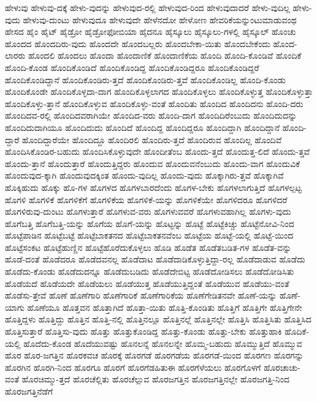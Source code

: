 {ಹೇಳುವು
ಹೇಳುವು-ದಕ್ಕೆ
ಹೇಳು-ವುದನ್ನು
ಹೇಳುವುದ-ರಲ್ಲಿ
ಹೇಳುವುದ-ರಿಂದ
ಹೇಳುವುದಾದರೆ
ಹೇಳು-ವುದಿಲ್ಲ
ಹೇಳು-ವುದು
ಹೇಳುವು-ದುಂಟು
ಹೇಳುವುದೂ
ಹೇಳುವುದೇ
ಹೇಳೆನದೋ
ಹೇಳೋಣ
ಹೇವರಿಕೆಯನ್ನುಂಟುಮಾಡುವಂಥ
ಹೇಸದ
ಹೈಂ
ಹೈಟ್
ಹೈಡ್ರೋ
ಹೈಡ್ರೋಫೋಬಿಯಾ
ಹೈದನೂ
ಹೈಸ್ಕೂಲು
ಹೈಸ್ಕೂಲು-ಗಳಲ್ಲಿ
ಹೈಸ್ಕೂಲ್
ಹೊಂಚು
ಹೊಂದದ
ಹೊಂದದಿರು-ವುದು
ಹೊಂದದೇ
ಹೊಂದಬಲ್ಲರು
ಹೊಂದಬೇಕಾ-ಯಿತು
ಹೊಂದಬೇಕೆಂದು
ಹೊಂದ-ಲಾರರು
ಹೊಂದಲಿ
ಹೊಂದಲು
ಹೊಂದಾ
ಹೊಂದಾಣಿಕೆ
ಹೊಂದಾಣಿಕೆಯ
ಹೊಂದಿ
ಹೊಂದಿ-ಕೊಂಡಿವೆ
ಹೊಂದಿಕೆ
ಹೊಂದಿ-ಕೊಂಡ
ಹೊಂದಿಕೊಂಡಿದೆ
ಹೊಂದಿಕೊಂಡಿದ್ದ
ಹೊಂದಿಕೊಂಡಿದ್ದರೂ
ಹೊಂದಿಕೊಂಡಿದ್ದರೆ
ಹೊಂದಿಕೊಂಡಿದ್ದಾನೆ
ಹೊಂದಿಕೊಂಡಿರು-ತ್ತದೆ
ಹೊಂದಿಕೊಂಡಿರು-ತ್ತವೆ
ಹೊಂದಿಕೊಂಡಿಲ್ಲ
ಹೊಂದಿ-ಕೊಂಡು
ಹೊಂದಿಕೊಂಡೇ
ಹೊಂದಿಕೊಳ್ಳದಾ-ದಾಗ
ಹೊಂದಿಕೊಳ್ಳಲಾಗದ
ಹೊಂದಿಕೊಳ್ಳಲು
ಹೊಂದಿಕೊಳ್ಳುತ್ತ
ಹೊಂದಿಕೊಳ್ಳುತ್ತಾ
ಹೊಂದಿಕೊಳ್ಳು-ತ್ತಾನೆ
ಹೊಂದಿಕೊಳ್ಳುವ
ಹೊಂದಿಕೊಳ್ಳು-ವಂತೆ
ಹೊಂದಿತು
ಹೊಂದಿದ
ಹೊಂದಿದನು
ಹೊಂದಿ-ದರು
ಹೊಂದಿದವ-ರಲ್ಲಿ
ಹೊಂದಿದವರಾಗಿಯೇ
ಹೊಂದಿದ-ವರು
ಹೊಂದಿ-ದಾಗ
ಹೊಂದಿದಿರೆಂಬುದು
ಹೊಂದಿದುದನ್ನು
ಹೊಂದಿದುದಾಗಿಯೂ
ಹೊಂದಿದುದು
ಹೊಂದಿದೆ
ಹೊಂದಿದ್ದ
ಹೊಂದಿದ್ದರೂ
ಹೊಂದಿದ್ದಾಗಿ
ಹೊಂದಿದ್ದಾನೆ
ಹೊಂದಿ-ದ್ದಾರೆ
ಹೊಂದಿದ್ದಾರೆಯೇ
ಹೊಂದಿದ್ದೂ
ಹೊಂದಿರಲಿ
ಹೊಂದಿರು-ತ್ತದೆ
ಹೊಂದಿರುವ
ಹೊಂದಿಲ್ಲ
ಹೊಂದಿವೆ
ಹೊಂದಿಸಿಕೊಂಡಿರ-ಬಹುದು
ಹೊಂದಿಸಿಕೊಳ್ಳುವುದೇ
ಹೊಂದೀತೆಂಬ
ಹೊಂದು-ತ್ತದೆ
ಹೊಂದುತ್ತ-ಲಿದೆ
ಹೊಂದು-ತ್ತವೆ
ಹೊಂದು-ತ್ತಾನೆ
ಹೊಂದುತ್ತಾರೆ
ಹೊಂದುತ್ತಿದ್ದರು
ಹೊಂದುವ
ಹೊಂದುವನೆಂಬುದು
ಹೊಂದು-ವಾಗ
ಹೊಂದುವಿಕೆ
ಹೊಂದುವುದ-ಕ್ಕಾಗಿ
ಹೊಂದುವುದಕ್ಕಿಂತ
ಹೊಂದು-ವುದಿಲ್ಲ
ಹೊಂದು-ವುದು
ಹೊಕ್ಕಾಗಿರು-ತ್ತವೆ
ಹೊಕ್ಕಾಗಿವೆ
ಹೊಕ್ಕಿಹುದು
ಹೊಕ್ಕು
ಹೊ-ಗಳ
ಹೊಗಳದ
ಹೊಗಳಬಾರದೆಂದು
ಹೊಗಳ-ಬೇಕು
ಹೊಗಳಲಾಗುತ್ತಿದೆ
ಹೊಗಳಲ್ಪಟ್ಟ
ಹೊಗಳಿ
ಹೊಗಳಿಕೆ
ಹೊಗಳಿಕೆಗೆ
ಹೊಗಳಿಕೆಯ
ಹೊಗಳಿಕೆ-ಯನ್ನು
ಹೊಗಳಿಕೆಯೇ
ಹೊಗಳಿದರೂ
ಹೊಗಳಿದರೆ
ಹೊಗಳಿರುವು-ದುಂಟು
ಹೊಗಳುತ್ತಾರೆ
ಹೊಗಳುವ-ವರು
ಹೊಗಳುವವರೆ
ಹೊಗಳುವಹಾಗಿಲ್ಲ
ಹೊಗಳು-ವುದು
ಹೊಗೆಬತ್ತಿ
ಹೊಗೆಬತ್ತಿ-ಯನ್ನು
ಹೊಗೆಯ
ಹೊಗೆ-ಯನ್ನು
ಹೊಟ್ಟನ್ನು
ಹೊಟ್ಟೆ
ಹೊಟ್ಟೆಕಿಚ್ಚು
ಹೊಟ್ಟೆನೋವಿ-ನಿಂದ
ಹೊಟ್ಟೆಪಾಡಿನ
ಹೊಟ್ಟೆಬಟ್ಟೆ
ಹೊಟ್ಟೆಬಾಕತನದ
ಹೊಟ್ಟೆಬಾಕತನವೆಂಬ
ಹೊಟ್ಟೆಯ
ಹೊಟ್ಟೆ-ಯಲ್ಲಿ
ಹೊಟ್ಟೆ-ಯಿಂದ
ಹೊಟ್ಟೆಸಂಕಟ
ಹೊಟ್ಟೆಹುಣ್ಣಿನ
ಹೊಟ್ಟೆಹೊರೆದುಕೊಳ್ಳಲು
ಹೊಡಿ
ಹೊಡೆತ
ಹೊಡೆತಬಡಿತ-ಗಳ
ಹೊಡೆತ-ವನ್ನು
ಹೊಡೆ-ದಂತೆ
ಹೊಡೆದರೂ
ಹೊಡೆದವನಲ್ಲ
ಹೊಡೆದಾಟ
ಹೊಡೆದಾಡಿಕೊಳ್ಳುತ್ತಿದ್ದಾ-ರಲ್ಲ
ಹೊಡೆದಾಡುವ
ಹೊಡೆದು
ಹೊಡೆದು-ಕೊಂಡು
ಹೊಡೆದುದನ್ನೂ
ಹೊಡೆದುಬಡಿದು
ಹೊಡೆದೇಬಿಟ್ಟ
ಹೊಡೆದೋಡಿಸಲು
ಹೊಡೆದೋಡಿಸಿತು
ಹೊಡೆಯದೆ
ಹೊಡೆಯದೇ
ಹೊಡೆಯಲು
ಹೊಡೆಯುತ್ತ
ಹೊಡೆಯುತ್ತಿದ್ದಂತೆ
ಹೊಡೆಯುವ
ಹೊಡೆಯು-ವಂತೆ
ಹೊಡೆಸು-ತ್ತೇವೆ
ಹೊಣೆ
ಹೊಣೆಗಾರಿ
ಹೊಣೆಗಾರಿಕೆ
ಹೊಣೆಗಾರಿಕೆಯ
ಹೊಣೆಗೇಡಿತನವೇ
ಹೊಣೆ-ಯನ್ನು
ಹೊಣೆ-ಯಾಗು
ಹೊಣೆಯೂ
ಹೊತ್ತವನ
ಹೊತ್ತಾಗಿದೆ
ಹೊತ್ತಾ-ಯಿತು
ಹೊತ್ತಿ-ಕೊಂಡಿತು
ಹೊತ್ತಿಗೆ
ಹೊತ್ತಿಗೇ
ಹೊತ್ತಿಗೇನೇ
ಹೊತ್ತಿದ್ದಳು
ಹೊತ್ತಿದ್ದು
ಹೊತ್ತಿನ
ಹೊತ್ತಿ-ನಲ್ಲಿ
ಹೊತ್ತಿನಲ್ಲೂ
ಹೊತ್ತಿನಲ್ಲೆ
ಹೊತ್ತಿನಲ್ಲೇ
ಹೊತ್ತಿಸಿ
ಹೊತ್ತಿಸಿತು
ಹೊತ್ತಿಸಿದ
ಹೊತ್ತಿಸುತ್ತಾರೆ
ಹೊತ್ತಿಸು-ವುದು
ಹೊತ್ತು
ಹೊತ್ತುಕೊಂಡಿದ್ದ
ಹೊತ್ತು-ಕೊಂಡು
ಹೊತ್ತು-ಬೇಕು
ಹೊತ್ತುಹಾಕಿ
ಹೊದಿಕೆ-ಯಲ್ಲಿ
ಹೊದೆದು-ಕೊಂಡ
ಹೊದೆಯುವಷ್ಟು
ಹೊನಲನ್ನೆ
ಹೊನಲನ್ನೇ
ಹೊಮ್ಮ-ಬಹುದು
ಹೊಮ್ಮುತ್ತಿದೆ
ಹೊಮ್ಮುವ
ಹೊರ
ಹೊರ-ಜಗತ್ತಿನ
ಹೊರಕವಚ
ಹೊರಕ್ಕೆ
ಹೊರಗಡೆ
ಹೊರಗಡೆಯ
ಹೊರಗಡೆ-ಯಿಂದ
ಹೊರಗಣ
ಹೊರಗನ್ನು
ಹೊರಗಿನ
ಹೊರಗಿ-ನಿಂದ
ಹೊರಗೂ
ಹೊರಗೆ
ಹೊರಗೆಡಹಿತುಈ
ಹೊರಗೆಳೆಯಲು
ಹೊರಗೊಳಗೆ
ಹೊರಚಾಚು-ವಂತೆ
ಹೊರಚಿಮ್ಮು-ತ್ತದೆ
ಹೊರಚೆಲ್ಲಿತು
ಹೊರಚೆಲ್ಲುವ
ಹೊರಜಗತ್ತಿನ
ಹೊರಜಗತ್ತಿನಲ್ಲೇ
ಹೊರಜಗತ್ತಿ-ನಿಂದ
ಹೊರಜಗತ್ತಿನೆಡೆಗೆ
}
